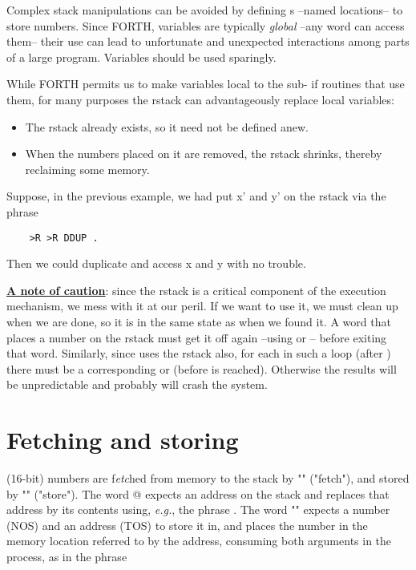 Complex stack manipulations can be avoided by defining s --named locations-- to store numbers. Since FORTH, variables are typically \textit{global} --any word can access them-- their use can lead to unfortunate and unexpected interactions among parts of a large program. Variables should be used sparingly.

While FORTH permits us to make variables local to the sub- if routines that use them, for many purposes the rstack can advantageously replace local variables:

\begin{itemize}
    \item The rstack already exists, so it need not be defined anew.
    \item When the numbers placed on it are removed, the rstack shrinks, thereby reclaiming some memory.
\end{itemize}

Suppose, in the previous example, we had put x’ and y’ on the rstack via the phrase

\begin{lstlisting}
    >R >R DDUP .
\end{lstlisting}

Then we could duplicate and access x and y with no trouble.

\leftbar[1\linewidth]
\underline{\textbf{A note of caution}}: since the rstack is a critical component of the execution mechanism, we mess with it at our peril. If we want to use it, we must clean up when we are done, so it is in the same state as when we found it. A word that places a number on the rstack must get it off again --using  or -- before exiting that word\footnotemark. Similarly, since  uses the rstack also, for each  in such a loop (after ) there must be a corresponding  or  (before  is reached). Otherwise the results will be unpredictable and probably will crash the system.
\endleftbar


\section{Fetching and storing}

 (16-bit) numbers are f\textit{etc}hed from memory to the stack by "" ("fetch"), and stored by "\bc{!}" ("store"). The word @ expects an address on the stack and replaces that address by its contents using, \textit{e.g.}, the phrase . The word "\regc{!}" expects a number (NOS) and an address (TOS) to store it in, and places the number in the memory location referred to by the address, consuming both arguments in the process, as in the phrase 

